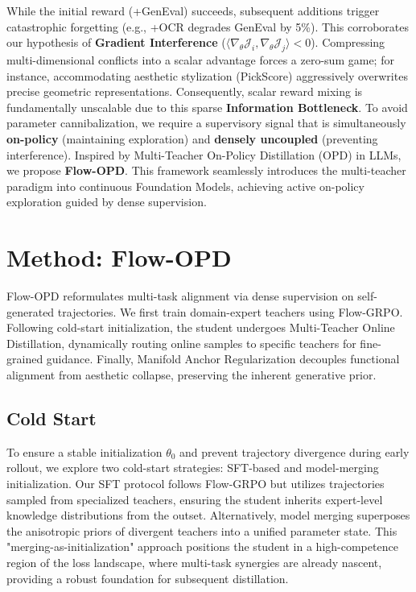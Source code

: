While the initial reward (+GenEval) succeeds, subsequent additions trigger catastrophic forgetting (e.g., +OCR degrades GenEval by 5\%). This corroborates our hypothesis of \textbf{Gradient Interference} ($\langle \nabla_\theta \mathcal{J}_i, \nabla_\theta \mathcal{J}_j \rangle < 0$). Compressing multi-dimensional conflicts into a scalar advantage forces a zero-sum game; for instance, accommodating aesthetic stylization (PickScore) aggressively overwrites precise geometric representations.
%
Consequently, scalar reward mixing is fundamentally unscalable due to this sparse \textbf{Information Bottleneck}. To avoid parameter cannibalization, we require a supervisory signal that is simultaneously \textbf{on-policy} (maintaining exploration) and \textbf{densely uncoupled} (preventing interference). Inspired by Multi-Teacher On-Policy Distillation (OPD) in LLMs, we propose \textbf{Flow-OPD}. This framework seamlessly introduces the multi-teacher paradigm into continuous Foundation Models, achieving active on-policy exploration guided by dense supervision.

\section{Method: Flow-OPD}
Flow-OPD reformulates multi-task alignment via dense supervision on self-generated trajectories. We first train domain-expert teachers using Flow-GRPO. Following cold-start initialization, the student undergoes Multi-Teacher Online Distillation, dynamically routing online samples to specific teachers for fine-grained guidance. Finally, Manifold Anchor Regularization decouples functional alignment from aesthetic collapse, preserving the inherent generative prior.

\subsection{Cold Start}
To ensure a stable initialization $\theta_0$ and prevent trajectory divergence during early rollout, we explore two cold-start strategies: SFT-based and model-merging initialization. Our SFT protocol follows Flow-GRPO but utilizes trajectories sampled from specialized teachers, ensuring the student inherits expert-level knowledge distributions from the outset. Alternatively, model merging superposes the anisotropic priors of divergent teachers into a unified parameter state. This "merging-as-initialization" approach positions the student in a high-competence region of the loss landscape, where multi-task synergies are already nascent, providing a robust foundation for subsequent distillation.


